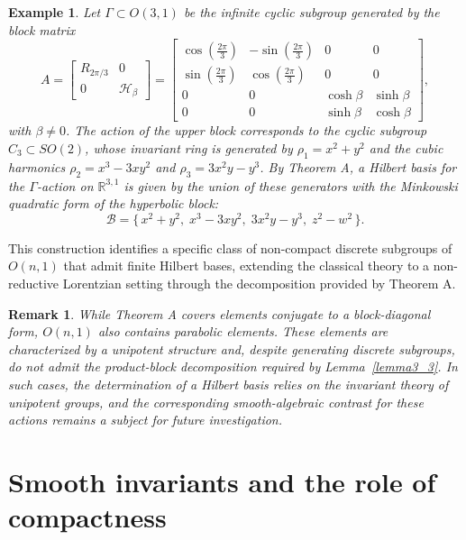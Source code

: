 \documentclass[]{article}
\newtheorem{example}[theorem]{Example}
\newtheorem{remark}[theorem]{Remark}
\begin{document}
\begin{example}
	Let $\Gamma \subset O(3,1)$ be the infinite cyclic subgroup generated by the block matrix$$A = \begin{bmatrix}
		R_{2\pi/3} & 0 \\
		0 & \mathcal{H}_\beta
	\end{bmatrix} =
	\begin{bmatrix}
		\cos(\tfrac{2\pi}{3}) & -\sin(\tfrac{2\pi}{3}) & 0 & 0 \\
		\sin(\tfrac{2\pi}{3}) & \cos(\tfrac{2\pi}{3}) & 0 & 0 \\
		0 & 0 & \cosh\beta & \sinh\beta \\
		0 & 0 & \sinh\beta & \cosh\beta
	\end{bmatrix},$$with $\beta \neq 0$. The action of the upper block corresponds to the cyclic subgroup $C_3 \subset SO(2)$, whose invariant ring is generated by $\rho_1 = x^2+y^2$ and the cubic harmonics $\rho_2 = x^3 - 3xy^2$ and $\rho_3 = 3x^2y - y^3$. By Theorem A, a Hilbert basis for the $\Gamma$-action on $\mathbb{R}^{3,1}$ is given by the union of these generators with the Minkowski quadratic form of the hyperbolic block:$$\mathcal{B} = \{\, x^2+y^2,\; x^3 - 3xy^2,\; 3x^2y - y^3,\; z^2-w^2 \,\}.$$
\end{example}

\medskip

This construction identifies a specific class of non-compact discrete subgroups of $O(n,1)$ that admit finite Hilbert bases, extending the classical theory to a non-reductive Lorentzian setting through the decomposition provided by Theorem A.

\begin{remark}
	While Theorem A covers elements conjugate to a block-diagonal form, $O(n,1)$ also contains parabolic elements. These elements are characterized by a unipotent structure and, despite generating discrete subgroups, do not admit the product-block decomposition required by Lemma~\ref{lemma3_3}. In such cases, the determination of a Hilbert basis relies on the invariant theory of unipotent groups, and the corresponding smooth-algebraic contrast for these actions remains a subject for future investigation.
\end{remark}


\section{Smooth invariants and the role of compactness}
\end{document}
